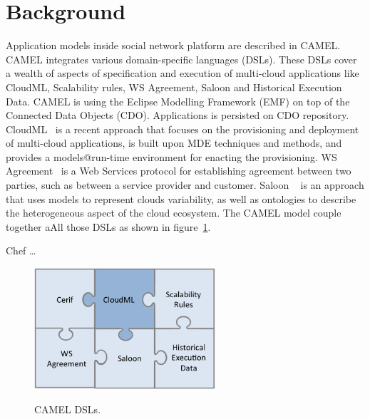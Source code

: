 \section{Background}
Application models inside social network platform are described in CAMEL. CAMEL integrates various domain-specific languages (DSLs). These DSLs cover a wealth of aspects of specification and execution of multi-cloud applications like CloudML, Scalability rules, WS Agreement, Saloon and Historical Execution Data. CAMEL is using the Eclipse Modelling Framework (EMF) on top of the Connected Data Objects (CDO). Applications is persisted on CDO repository.
CloudML~\cite{FerryRossiniCMS13} is a recent approach that focuses on the provisioning and deployment of multi-cloud applications, is built upon MDE techniques and methods, and provides a models@run-time environment for enacting the provisioning.  WS Agreement~\cite{andrieux2007web} is a Web Services protocol for establishing agreement between two parties, such as between a service provider and customer. Saloon ~\cite{quinton2013towards} is an approach that uses models to represent clouds variability, as well as ontologies to describe the heterogeneous aspect of the cloud ecosystem. The CAMEL model couple together aAll those DSLs as shown in figure~\ref{fig:dsls}.

Chef \ldots


\begin{figure}[h]
	\caption{CAMEL DSLs.}
	\includegraphics[width=0.6\textwidth,natwidth=200,natheight=150]{./fig/dsl.png}
	\centering
	\label{fig:dsls}
\end{figure}


